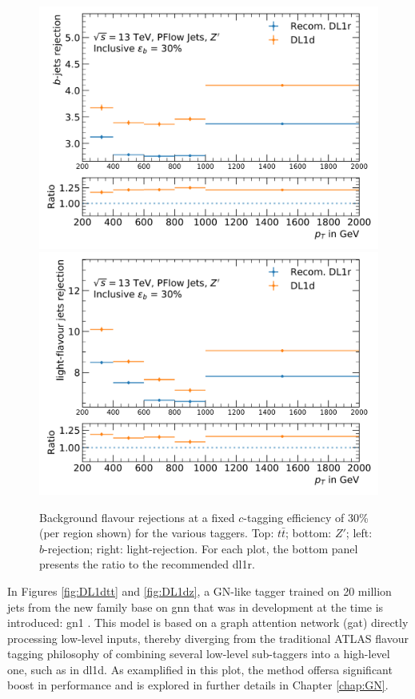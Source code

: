 \begin{center}
\begin{figure}[h!]
\centerline{
\includegraphics[scale=0.425]{Images/FTAG/DL1d/perpT/zpcb.png}
\includegraphics[scale=0.425]{Images/FTAG/DL1d/perpT/zpcu.png}
}
\caption{Background flavour rejections at a fixed $c$-tagging efficiency of 30\% (per region shown) for the various taggers. Top: $t\bar{t}$; bottom: $Z'$; left: $b$-rejection; right: light-rejection. For each plot, the bottom panel presents the ratio to the recommended \gls{dl1r}.}
\label{fig:ptDL1dz}
\end{figure}
\end{center}

In Figures \ref{fig:DL1dtt} and \ref{fig:DL1dz}, a GN-like tagger trained on 20 million jets from the new family base on \gls{gnn} that was in development at the time is introduced: \gls{gn1} \cite{ATL-PHYS-PUB-2022-027}. This model is based on a graph attention network (\gls{gat}) directly processing low-level inputs, thereby diverging from the traditional ATLAS flavour tagging philosophy of combining several low-level sub-taggers into a high-level one, such as in \gls{dl1d}. As examplified in this plot, the method offersa significant boost in performance and is explored in further details in Chapter \ref{chap:GN}. \\

